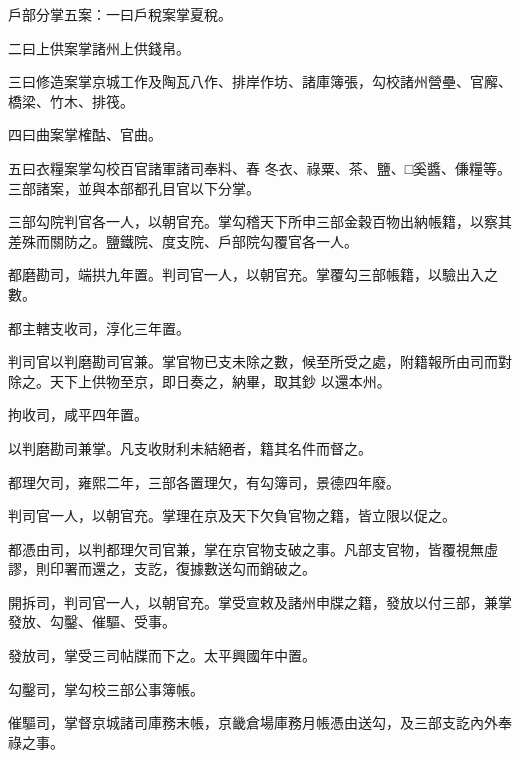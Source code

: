 \begin{pinyinscope}
 戶部分掌五案：一曰戶稅案掌夏稅。



 二曰上供案掌諸州上供錢帛。



 三曰修造案掌京城工作及陶瓦八作、排岸作坊、諸庫簿張，勾校諸州營壘、官廨、橋梁、竹木、排筏。



 四曰曲案掌榷酤、官曲。



 五曰衣糧案掌勾校百官諸軍諸司奉料、春
 冬衣、祿粟、茶、鹽、□奚醬、傔糧等。三部諸案，並與本部都孔目官以下分掌。



 三部勾院判官各一人，以朝官充。掌勾稽天下所申三部金穀百物出納帳籍，以察其差殊而關防之。鹽鐵院、度支院、戶部院勾覆官各一人。



 都磨勘司，端拱九年置。判司官一人，以朝官充。掌覆勾三部帳籍，以驗出入之數。



 都主轄支收司，淳化三年置。



 判司官以判磨勘司官兼。掌官物已支未除之數，候至所受之處，附籍報所由司而對除之。天下上供物至京，即日奏之，納畢，取其鈔
 以還本州。



 拘收司，咸平四年置。



 以判磨勘司兼掌。凡支收財利未結絕者，籍其名件而督之。



 都理欠司，雍熙二年，三部各置理欠，有勾簿司，景德四年廢。



 判司官一人，以朝官充。掌理在京及天下欠負官物之籍，皆立限以促之。



 都憑由司，以判都理欠司官兼，掌在京官物支破之事。凡部支官物，皆覆視無虛謬，則印署而還之，支訖，復據數送勾而銷破之。



 開拆司，判司官一人，以朝官充。掌受宣敕及諸州申牒之籍，發放以付三部，兼掌發放、勾鑿、催驅、受事。



 發放司，掌受三司帖牒而下之。太平興國年中置。



 勾鑿司，掌勾校三部公事簿帳。



 催驅司，掌督京城諸司庫務末帳，京畿倉場庫務月帳憑由送勾，及三部支訖內外奉祿之事。




\end{pinyinscope}

